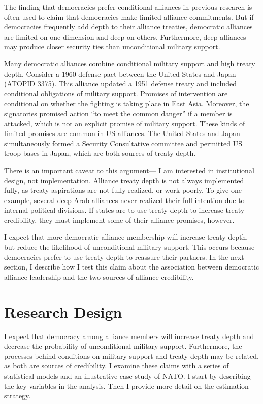 \documentclass[12pt]{article}
\begin{document}
The finding that democracies prefer conditional alliances in previous research is often used to claim that democracies make limited alliance commitments. 
But if democracies frequently add depth to their alliance treaties, democratic alliances are limited on one dimension and deep on others. 
Furthermore, deep alliances may produce closer security ties than unconditional military support.  


Many democratic alliances combine conditional military support and high treaty depth. 
Consider a 1960 defense pact between the United States and Japan (ATOPID 3375).
This alliance updated a 1951 defense treaty and included conditional obligations of military support. 
Promises of intervention are conditional on whether the fighting is taking place in East Asia. 
Moreover, the signatories promised action ``to meet the common danger'' if a member is attacked, which is not an explicit promise of military support. 
These kinds of limited promises are common in US alliances. 
The United States and Japan simultaneously formed a Security Consultative committee and permitted US troop bases in Japan, which are both sources of treaty depth.  


There is an important caveat to this argument--- I am interested in institutional design, not implementation.
Alliance treaty depth is not always implemented fully, as treaty aspirations are not fully realized, or work poorly. 
To give one example, several deep Arab alliances never realized their full intention due to internal political divisions.  
If states are to use treaty depth to increase treaty credibility, they must implement some of their alliance promises, however. 


I expect that more democratic alliance membership will increase treaty depth, but reduce the likelihood of unconditional military support.  
This occurs because democracies prefer to use treaty depth to reassure their partners. 
In the next section, I describe how I test this claim about the association between democratic alliance leadership and the two sources of alliance credibility. 



\section{Research Design}

 
I expect that democracy among alliance members will increase treaty depth and decrease the probability of unconditional military support. 
Furthermore, the processes behind conditions on military support and treaty depth may be related, as both are sources of credibility. 
I examine these claims with a series of statistical models and an illustrative case study of NATO. 
I start by describing the key variables in the analysis. 
Then I provide more detail on the estimation strategy. 
\end{document}
